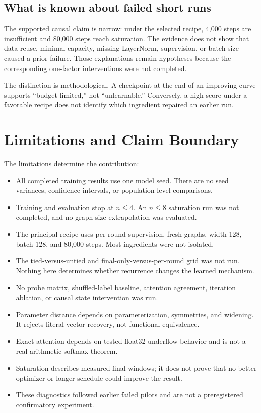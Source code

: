 \documentclass[10pt,twocolumn]{article}
\begin{document}
\subsection{What is known about failed short runs}

The supported causal claim is narrow: under the selected recipe, 4,000 steps
are insufficient and 80,000 steps reach saturation. The evidence does not show
that data reuse, minimal capacity, missing LayerNorm, supervision, or batch
size caused a prior failure. Those explanations remain hypotheses because the
corresponding one-factor interventions were not completed.

The distinction is methodological. A checkpoint at the end of an improving
curve supports ``budget-limited,'' not ``unlearnable.'' Conversely, a high
score under a favorable recipe does not identify which ingredient repaired an
earlier run.

\section{Limitations and Claim Boundary}

The limitations determine the contribution:
\begin{itemize}
  \item All completed training results use one model seed. There are no seed
  variances, confidence intervals, or population-level comparisons.
  \item Training and evaluation stop at \(n\le4\). An \(n\le8\) saturation run
  was not completed, and no graph-size extrapolation was evaluated.
  \item The principal recipe uses per-round supervision, fresh graphs, width
  128, batch 128, and 80,000 steps. Most ingredients were not isolated.
  \item The tied-versus-untied and final-only-versus-per-round grid was not run.
  Nothing here determines whether recurrence changes the learned mechanism.
  \item No probe matrix, shuffled-label baseline, attention agreement,
  iteration ablation, or causal state intervention was run.
  \item Parameter distance depends on parameterization, symmetries, and
  widening. It rejects literal vector recovery, not functional equivalence.
  \item Exact attention depends on tested float32 underflow behavior and is
  not a real-arithmetic softmax theorem.
  \item Saturation describes measured final windows; it does not prove that no
  better optimizer or longer schedule could improve the result.
  \item These diagnostics followed earlier failed pilots and are not a
  preregistered confirmatory experiment.
\end{itemize}
\end{document}
